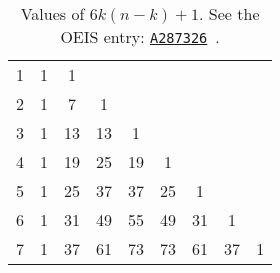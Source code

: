 \begin{examp}
\begin{table}[H]
\begin{tabular}{c|cccccccc}
            1     & 1 & 1  &    &    &    &    &    &   \\
            2     & 1 & 7  & 1  &    &    &    &    &   \\
            3     & 1 & 13 & 13 & 1  &    &    &    &   \\
            4     & 1 & 19 & 25 & 19 & 1  &    &    &   \\
            5     & 1 & 25 & 37 & 37 & 25 & 1  &    &   \\
            6     & 1 & 31 & 49 & 55 & 49 & 31 & 1  &   \\
            7     & 1 & 37 & 61 & 73 & 73 & 61 & 37 & 1
        \end{tabular}
        \caption{Values of $6k(n-k) + 1$.
        See the OEIS entry: \href{https://oeis.org/A287326}{\texttt{A287326}}~\cite{kolosov2017third}.}
        \label{tab:table-row-sums-gives-cubes}
    \end{table}
\end{examp}
